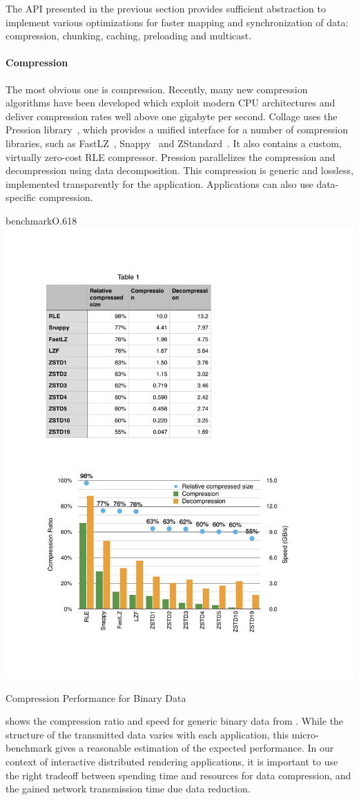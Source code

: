 The API presented in the previous section provides sufficient abstraction to
implement various optimizations for faster mapping and synchronization of data:
compression, chunking, caching, preloading and multicast.

\paragraph{Compression}
The most obvious one is compression. Recently, many new compression algorithms
have been developed which exploit modern CPU architectures and deliver
compression rates well above one gigabyte per second. \textsf{Collage} uses the
Pression library~\cite{pression}, which provides a unified interface for a
number of compression libraries, such as FastLZ~\cite{jesperfast},
Snappy~\cite{snappy} and ZStandard~\cite{zstd}. It also contains a custom,
virtually zero-cost RLE compressor. Pression parallelizes the compression and
decompression using data decomposition. This compression is generic and
lossless, implemented transparently for the application. Applications can also
use data-specific compression.

\begin{wrapfloat}{benchmark}{O}{.618\textwidth}
\includegraphics[width=.618\textwidth]{results/compressor.pdf}
  {\caption{\label{rCompress}Compression Performance for Binary Data}}
\end{wrapfloat}

 shows the compression ratio and speed for generic binary data from \cite{ESP:18}. While the structure of the transmitted data varies with each application, this micro-bench\-mark gives a reasonable estimation of the expected performance. In our context of interactive distributed rendering applications, it is important to use the right tradeoff between spending time and resources for data compression, and the gained network transmission time due data reduction.

